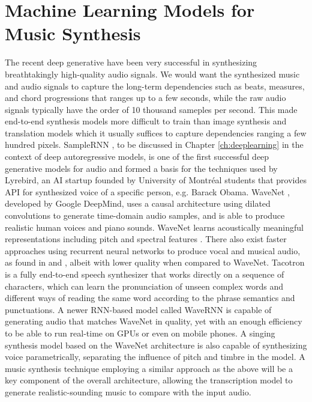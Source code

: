 \section{Machine Learning Models for Music Synthesis}

The recent deep generative have been very successful in synthesizing breathtakingly high-quality audio signals.
We would want the synthesized music and audio signals to capture the long-term dependencies such as beats, measures, and chord progressions that ranges up to a few seconds, while the raw audio signals typically have the order of 10 thousand sameples per second.
This made end-to-end synthesis models more difficult to train than image synthesis and translation models which it usually suffices to capture dependencies ranging a few hundred pixels.
SampleRNN \cite{mehri2016samplernn}, to be discussed in Chapter \ref{ch:deeplearning} in the context of deep autoregressive models, is one of the first successful deep generative models for audio and formed a basis for the techniques used by Lyrebird, an AI startup founded by University of Montr\'{e}al students that provides API for synthesized voice of a specific person, e.g. Barack Obama.
WaveNet \cite{oord2016wavenet}, developed by Google DeepMind, uses a causal architecture using dilated convolutions to generate time-domain audio samples, and is able to produce realistic human voices and piano sounds.
WaveNet learns acoustically meaningful representations including pitch and spectral features \cite{hua2018wavenet}.
There also exist faster approaches using recurrent neural networks to produce vocal and musical audio, as found in \cite{nayebi2015gruv} and \cite{kalingeri2016generation}, albeit with lower quality when compared to WaveNet.
Tacotron \cite{wang2017tacotron, shen2018tacotron} is a fully end-to-end speech synthesizer that works directly on a sequence of characters, which can learn the pronunciation of unseen complex words and different ways of reading the same word according to the phrase semantics and punctuations.
A newer RNN-based model called WaveRNN \cite{kalchbrenner2018wavernn} is capable of generating audio that matches WaveNet in quality, yet with an enough efficiency to be able to run real-time on GPUs or even on mobile phones.
A singing synthesis model \cite{blaauw2017singing} based on the WaveNet architecture is also capable of synthesizing voice parametrically, separating the influence of pitch and timbre in the model.
A music synthesis technique employing a similar approach as the above will be a key component of the overall architecture, allowing the transcription model to generate realistic-sounding music to compare with the input audio.


